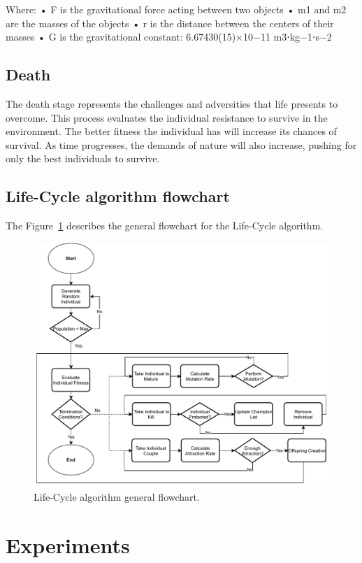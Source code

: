 \documentclass[runningheads]{llncs}
\begin{document}
Where:
•	F is the gravitational force acting between two objects
•	m1 and m2 are the masses of the objects
•	r is the distance between the centers of their masses
•	G is the gravitational constant: 6.67430(15)×10−11 m3⋅kg−1⋅s−2


\subsection{Death}

The death stage represents the challenges and adversities that life presents to
overcome. This process evaluates the individual resistance to survive in the
environment. The better fitness the individual has will increase its chances of
survival. As time progresses, the demands of nature will also increase, pushing
for only the best individuals to survive.

\subsection{Life-Cycle algorithm flowchart}

The Figure~\ref{fig4} describes the general flowchart for the Life-Cycle algorithm.

\begin{figure}
    \includegraphics[width=\textwidth]{img/fig4_flowchart.pdf}
    \caption{Life-Cycle algorithm general flowchart.} \label{fig4}
    \end{figure}


\section{Experiments} 
\end{document}
